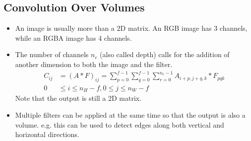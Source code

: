 \subsection{Convolution Over Volumes}
\begin{itemize}
  \item An image is usually more than a 2D matrix. An RGB image has 3 channels, while an RGBA image has 4 channels. 
  \item The number of channels $n_c$ (also called depth) calls for the addition of another dimension to both the image and the filter.
  \begin{align*}
    C_{ij}&=\left(A*F\right)_{ij}=\displaystyle\sum_{p=0}^{f-1}\displaystyle\sum_{q=0}^{f-1}\displaystyle\sum_{r=0}^{n_c-1}A_{i+p,j+q,k}*F_{pqk}\\
    0&\le i\le n_H-f, 0\le j\le n_W-f
  \end{align*}
  Note that the output is still a 2D matrix.
  \item Multiple filters can be applied at the same time so that the output is also a volume. e.g. this can be used to detect edges along both vertical and horizontal directions.
\end{itemize}

